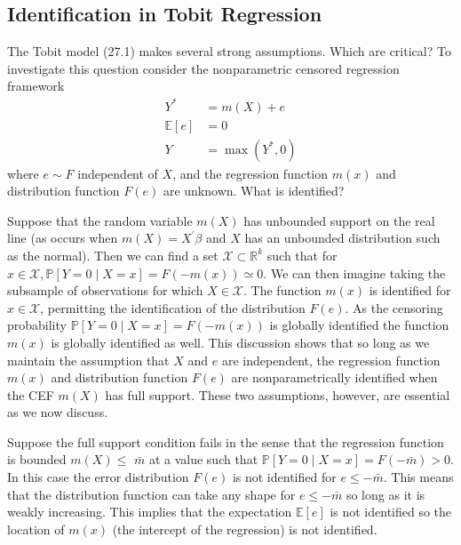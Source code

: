 \documentclass[10pt]{article}
\begin{document}
\subsection{Identification in Tobit Regression}
The Tobit model (27.1) makes several strong assumptions. Which are critical? To investigate this question consider the nonparametric censored regression framework
$$
\begin{aligned}
Y^{*} &=m(X)+e \\
\mathbb{E}[e] &=0 \\
Y &=\max \left(Y^{*}, 0\right)
\end{aligned}
$$
where $e \sim F$ independent of $X$, and the regression function $m(x)$ and distribution function $F(e)$ are unknown. What is identified?

Suppose that the random variable $m(X)$ has unbounded support on the real line (as occurs when $m(X)=X^{\prime} \beta$ and $X$ has an unbounded distribution such as the normal). Then we can find a set $\mathscr{X} \subset \mathbb{R}^{k}$ such that for $x \in \mathscr{X}, \mathbb{P}[Y=0 \mid X=x]=F(-m(x)) \simeq 0$. We can then imagine taking the subsample of observations for which $X \in \mathscr{X}$. The function $m(x)$ is identified for $x \in \mathscr{X}$, permitting the identification of the distribution $F(e)$. As the censoring probability $\mathbb{P}[Y=0 \mid X=x]=F(-m(x))$ is globally identified the function $m(x)$ is globally identified as well. This discussion shows that so long as we maintain the assumption that $X$ and $e$ are independent, the regression function $m(x)$ and distribution function $F(e)$ are nonparametrically identified when the CEF $m(X)$ has full support. These two assumptions, however, are essential as we now discuss.

Suppose the full support condition fails in the sense that the regression function is bounded $m(X) \leq$ $\bar{m}$ at a value such that $\mathbb{P}[Y=0 \mid X=x]=F(-\bar{m})>0$. In this case the error distribution $F(e)$ is not identified for $e \leq-\bar{m}$. This means that the distribution function can take any shape for $e \leq-\bar{m}$ so long as it is weakly increasing. This implies that the expectation $\mathbb{E}[e]$ is not identified so the location of $m(x)$ (the intercept of the regression) is not identified.
\end{document}
